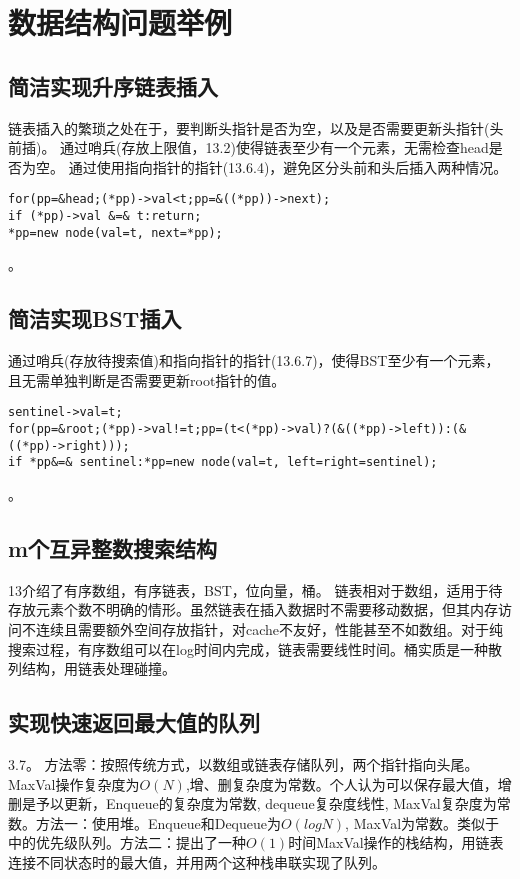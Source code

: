 


\section{数据结构问题举例}
\subsection{简洁实现升序链表插入}
链表插入的繁琐之处在于，要判断头指针是否为空，以及是否需要更新头指针(头前插)。
通过哨兵(存放上限值，\cite{pp}13.2)使得链表至少有一个元素，无需检查head是否为空。
通过使用指向指针的指针(\cite{pp}13.6.4)，避免区分头前和头后插入两种情况。
\begin{verbatim}
for(pp=&head;(*pp)->val<t;pp=&((*pp))->next);
if (*pp)->val &=& t:return; 
*pp=new node(val=t, next=*pp);
\end{verbatim}
\label{problem:listInsert}。

\subsection{简洁实现BST插入}
通过哨兵(存放待搜索值)和指向指针的指针(\cite{pp}13.6.7)，使得BST至少有一个元素，且无需单独判断是否需要更新root指针的值。
\begin{verbatim}
sentinel->val=t;
for(pp=&root;(*pp)->val!=t;pp=(t<(*pp)->val)?(&((*pp)->left)):(&((*pp)->right)));
if *pp&=& sentinel:*pp=new node(val=t, left=right=sentinel);
\end{verbatim}
\label{problem:BSTInsert}。


\subsection{m个互异整数搜索结构}
\cite{pp}13介绍了有序数组，有序链表，BST，位向量，桶。
链表相对于数组，适用于待存放元素个数不明确的情形。虽然链表在插入数据时不需要移动数据，但其内存访问不连续且需要额外空间存放指针，对cache不友好，性能甚至不如数组。对于纯搜索过程，有序数组可以在log时间内完成，链表需要线性时间。桶实质是一种散列结构，用链表处理碰撞。


\subsection{实现快速返回最大值的队列}
\cite{bop}3.7。
方法零：按照传统方式，以数组或链表存储队列，两个指针指向头尾。MaxVal操作复杂度为$O(N)$,增、删复杂度为常数。个人认为可以保存最大值，增删是予以更新，Enqueue的复杂度为常数, dequeue复杂度线性, MaxVal复杂度为常数。方法一：使用堆。Enqueue和Dequeue为$O(logN)$, MaxVal为常数。类似于\cite{ita}中的优先级队列。方法二：\cite{bop}提出了一种$O(1)$时间MaxVal操作的栈结构，用链表连接不同状态时的最大值，并用两个这种栈串联实现了队列。


